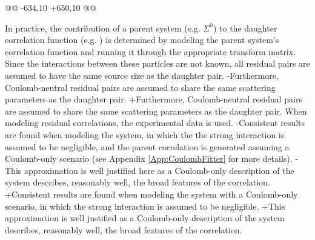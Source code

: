 @@ -634,10 +650,10 @@
 
 In practice, the contribution of a parent system (e.g. $\Sigma^{0}$\KchP) to the daughter correlation function (e.g. \LamKchP) is determined by modeling the parent system's correlation function and running it through the appropriate transform matrix.
 Since the interactions between these particles are not known, all residual pairs are assumed to have the same source size as the daughter pair.
-Furthermore, Coulomb-neutral residual pairs are assumed to share the same scattering parameters as the daughter pair.
+Furthermore, Coulomb-neutral residual pairs are assumed to share the same scattering parameters as the \LamK daughter pair.
 When modeling \XiKpm residual correlations, the experimental \XiKpm data is used. 
-Consistent results are found when modeling the \XiKpm system, in which the the strong interaction is assumed to be negligible, and the parent correlation is generated assuming a Coulomb-only scenario (see Appendix \ref{App:CoulombFitter} for more details).
-This approximation is well justified here as a Coulomb-only description of the system describes, reasonably well, the broad features of the correlation.   
+Consistent results are found when modeling the \XiKpm system with a Coulomb-only scenario, in which the strong interaction is assumed to be negligible.
+This approximation is well justified as a Coulomb-only description of the system describes, reasonably well, the broad features of the \XiKpm correlation.   
 
